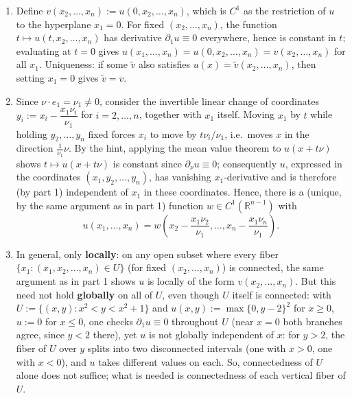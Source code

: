 \begin{exercisesolution}
\begin{enumerate}[label=\textbf{\arabic*.}]
  \item Define $v(x_2,\dots,x_n) := u(0,x_2,\dots,x_n)$, which is $C^1$ as the restriction of $u$
    to the hyperplane $x_1 = 0$. For fixed $(x_2,\dots,x_n)$, the function
    $t \mapsto u(t,x_2,\dots,x_n)$ has derivative $\partial_1 u \equiv 0$ everywhere, hence is
    constant in $t$; evaluating at $t=0$ gives $u(x_1,\dots,x_n) = u(0,x_2,\dots,x_n) =
    v(x_2,\dots,x_n)$ for all $x_1$. Uniqueness: if some $\tilde v$ also satisfies
    $u(x) = \tilde v(x_2,\dots,x_n)$, then setting $x_1 = 0$ gives $\tilde v = v$.
  \item Since $\nu\cdot e_1 = \nu_1 \neq 0$, consider the invertible linear change of coordinates
    $y_i := x_i - \dfrac{x_1\nu_i}{\nu_1}$ for $i = 2,\dots,n$, together with $x_1$ itself.
    Moving $x_1$ by $t$ while holding $y_2,\dots,y_n$ fixed forces $x_i$ to move by
    $t\nu_i/\nu_1$, i.e.\ moves $x$ in the direction $\tfrac{1}{\nu_1}\nu$. By the hint, applying
    the mean value theorem to $u(x+t\nu)$ shows $t \mapsto u(x+t\nu)$ is constant since
    $\partial_\nu u \equiv 0$; consequently $u$, expressed in the coordinates $(x_1, y_2,\dots,
    y_n)$, has vanishing $x_1$-derivative and is therefore (by part 1) independent of $x_1$ in
    these coordinates. Hence, there is a (unique, by the same argument as in part 1) function
    $w \in C^1(\mathbb{R}^{n-1})$ with
    \[
    u(x_1,\dots,x_n) = w\!\left(x_2 - \frac{x_1\nu_2}{\nu_1},\dots,x_n - \frac{x_1\nu_n}{\nu_1}\right).
    \]
  \item In general, only \textbf{locally}: on any open subset where every fiber
    $\{x_1 : (x_1,x_2,\dots,x_n) \in U\}$ (for fixed $(x_2,\dots,x_n)$) is connected, the same
    argument as in part 1 shows $u$ is locally of the form $v(x_2,\dots,x_n)$. But this need not
    hold \textbf{globally} on all of $U$, even though $U$ itself is connected: with
    $U := \{(x,y) : x^2 < y < x^2+1\}$ and $u(x,y) := \max\{0,y-2\}^2$ for $x \geq 0$, $u := 0$
    for $x \leq 0$, one checks $\partial_1 u \equiv 0$ throughout $U$ (near $x=0$ both branches
    agree, since $y < 2$ there), yet $u$ is not globally independent of $x$: for $y > 2$, the
    fiber of $U$ over $y$ splits into two disconnected intervals (one with $x>0$, one with
    $x<0$), and $u$ takes different values on each. So, connectedness of $U$ alone does not
    suffice; what is needed is connectedness of each vertical fiber of $U$.
\end{enumerate}
\end{exercisesolution}

